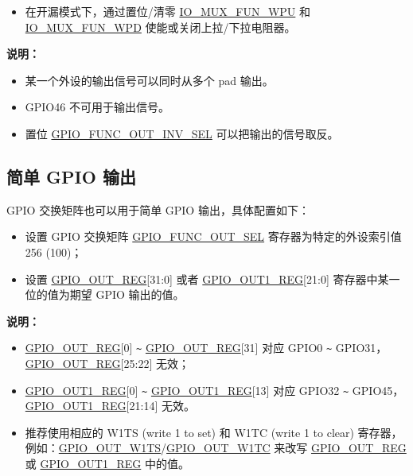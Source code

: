 \documentclass[main\_\_CN.tex]{subfiles}
\begin{document}
\begin{enumerate}
\begin{itemize}
        \begin{itemize}
            \item 0: \verb+~+5 mA
            \item 1: \verb+~+10 mA
            \item 2: \verb+~+20 mA（默认值）
            \item 3: \verb+~+40 mA
        \end{itemize}
        \item 在开漏模式下，通过置位/清零 \hyperref[fielddesc:IOMUXFUNWPU]{IO\_MUX\_FUN\_WPU} 和 \hyperref[fielddesc:IOMUXFUNWPD]{IO\_MUX\_FUN\_WPD} 使能或关闭上拉/下拉电阻器。
    \end{itemize}
\end{enumerate}

{\bfseries 说明：}
\begin{itemize}
\item 某一个外设的输出信号可以同时从多个 pad 输出。
\item GPIO46 不可用于输出信号。
\item 置位 \hyperref[fielddesc:GPIOFUNCNOUTINVSEL]{GPIO\_FUNC\_OUT\_INV\_SEL} 可以把输出的信号取反。
\end{itemize}

\subsection{简单 GPIO 输出}

GPIO 交换矩阵也可以用于简单 GPIO 输出，具体配置如下：
\begin{itemize}
    \item 设置 GPIO 交换矩阵 \hyperref[fielddesc:GPIOFUNCNOUTSEL]{GPIO\_FUNC\_OUT\_SEL} 寄存器为特定的外设索引值 256  (\hexprefix{}100)；
    \item 设置 \hyperref[regdesc:GPIOOUTREG]{GPIO\_OUT\_REG}[31:0] 或者 \hyperref[regdesc:GPIOOUT1REG]{GPIO\_OUT1\_REG}[21:0] 寄存器中某一位的值为期望 GPIO 输出的值。
\end{itemize}

{\bfseries 说明：}
\begin{itemize}
\item \hyperref[regdesc:GPIOOUTREG]{GPIO\_OUT\_REG}[0] \verb+~+ \hyperref[regdesc:GPIOOUTREG]{GPIO\_OUT\_REG}[31] 对应 GPIO0 \verb+~+ GPIO31，\hyperref[regdesc:GPIOOUTREG]{GPIO\_OUT\_REG}[25:22] 无效；
\item \hyperref[regdesc:GPIOOUT1REG]{GPIO\_OUT1\_REG}[0] \verb+~+ \hyperref[regdesc:GPIOOUT1REG]{GPIO\_OUT1\_REG}[13] 对应 GPIO32 \verb+~+ GPIO45，\hyperref[regdesc:GPIOOUT1REG]{GPIO\_OUT1\_REG}[21:14] 无效。
\item 推荐使用相应的 W1TS (write 1 to set) 和 W1TC (write 1 to clear) 寄存器，例如：\hyperref[fielddesc:GPIOOUTW1TS]{GPIO\_OUT\_W1TS}/\hyperref[fielddesc:GPIOOUTW1TC]{GPIO\_OUT\_W1TC} 来改写 \hyperref[regdesc:GPIOOUTREG]{GPIO\_OUT\_REG} 或 \hyperref[regdesc:GPIOOUT1REG]{GPIO\_OUT1\_REG} 中的值。
\end{itemize}
\end{document}
